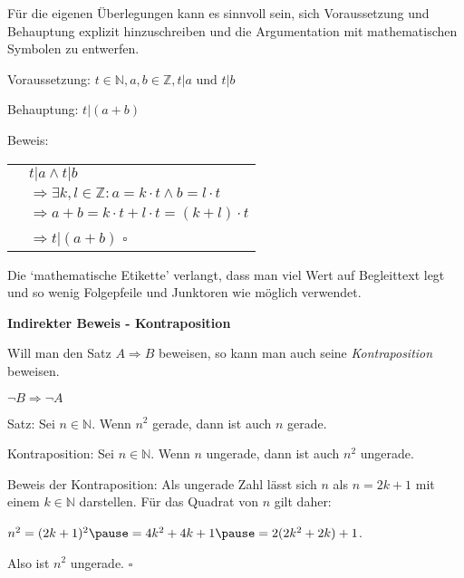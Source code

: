 \begin{frame}[fragile]

Für die eigenen Überlegungen kann es sinnvoll sein, sich Voraussetzung und Behauptung explizit hinzuschreiben und die Argumentation mit mathematischen Symbolen zu entwerfen.  \pause

Voraussetzung: $t \in \mathbb{N}, a, b \in \mathbb{Z}, t|a \text{ und } t|b$ \pause

Behauptung:  $t|(a+b)$  \pause

Beweis:

\begin{tabular}{l l}
& $t|a \land t|b$ \\
& $\Rightarrow \exists k,l \in \mathbb{Z}: a=k \cdot t \land b = l \cdot t$ \\
& $ \Rightarrow a+b= k \cdot t + l \cdot t = (k +l) \cdot t  $ \\
& $ \Rightarrow t | (a+b)  $ \hfill $\square$ \\
\end{tabular} \pause

Die `mathematische Etikette' verlangt, dass man viel Wert auf Begleittext legt und so wenig Folgepfeile und
Junktoren wie möglich verwendet.

\end{frame}

\begin{frame}[fragile]

\textbf{Indirekter Beweis - Kontraposition}

Will man den Satz $A \Rightarrow B$ beweisen, so kann man auch seine \textit{Kontraposition} beweisen.  

$\lnot B \Rightarrow \lnot A$ \pause

 
Satz: Sei $n \in \mathbb{N}$. Wenn $n^2$ gerade, dann ist auch $n$ gerade. \pause

Kontraposition:  \pause Sei $n \in \mathbb{N}$. Wenn $n$ ungerade, dann ist auch $n^2$ ungerade. \pause

Beweis der Kontraposition: Als ungerade Zahl lässt sich $n$ als $n = 2k+1$ mit einem $k \in \mathbb{N}$ darstellen. \pause Für das Quadrat von $n$ gilt daher: 

\quad $n^2=(2k+1)^2\pause=4k^2+4k+1\pause=2(2k^2+2k)+1$. \pause

Also ist $n^2$ ungerade.    \hfill $\square$
\end{frame}

